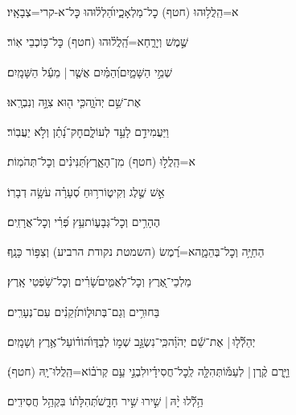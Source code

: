 \documentclass[12pt]{article}
\newcommand{\loc}[1]{\textsuperscript{\locf{#1}}}
\begin{document}
{\loc{ ב}~}‏א=הַֽלֲל֥וּהוּ (חטף) כׇל־מַלְאָכָ֑יו{\hfill}הַ֝לְל֗וּהוּ כׇּל־א-קרי=צְבָאָֽיו׃\par

{\loc{ ג}~}‏ שֶׁ֣מֶשׁ וְיָרֵ֑חַ{\hfill}א=הַֽ֝לֲל֗וּהוּ (חטף) כׇּל־כּ֥וֹכְבֵי אֽוֹר׃\par

{\loc{ ד}~}‏ שְׁמֵ֣י הַשָּׁמָ֑יִם{\hfill}וְ֝הַמַּ֗יִם אֲשֶׁ֤ר |  מֵעַ֬ל הַשָּׁמָֽיִם׃\par

{\loc{ ה}~}‏ אֶת־שֵׁ֣ם יְהֹוָ֑ה{\hfill}כִּ֤י ה֖וּא צִוָּ֣ה וְנִבְרָֽאוּ׃\par

{\loc{ ו}~}‏וַיַּעֲמִידֵ֣ם לָעַ֣ד לְעוֹלָ֑ם{\hfill}חׇק־נָ֝תַ֗ן וְלֹ֣א יַעֲבֽוֹר׃\par

{\loc{ ז}~}‏א=הַֽלֲל֣וּ (חטף)  מִן־הָאָ֑רֶץ{\hfill}תַּ֝נִּינִ֗ים וְכׇל־תְּהֹמֽוֹת׃\par

{\loc{ ח}~}‏אֵ֣שׁ  שֶׁ֣לֶג וְקִיט֑וֹר{\hfill}ר֥וּחַ סְ֝עָרָ֗ה עֹשָׂ֥ה דְבָרֽוֹ׃\par

{\loc{ ט}~}‏הֶהָרִ֥ים וְכׇל־גְּבָע֑וֹת{\hfill}עֵ֥ץ פְּ֝רִ֗י וְכׇל־אֲרָזִֽים׃\par

{\loc{ י}~}‏הַחַיָּ֥ה וְכׇל־בְּהֵמָ֑ה{\hfill}א=רֶ֝מֶשׂ (השמטת נקודת הרביע) וְצִפּ֥וֹר כָּנָֽף׃\par

{\loc{ יא}~}‏מַלְכֵי־אֶ֭רֶץ וְכׇל־לְאֻמִּ֑ים{\hfill}שָׂ֝רִ֗ים וְכׇל־שֹׁ֥פְטֵי אָֽרֶץ׃\par

{\loc{ יב}~}‏בַּחוּרִ֥ים וְגַם־בְּתוּל֑וֹת{\hfill}זְ֝קֵנִ֗ים עִם־נְעָרִֽים׃\par

{\loc{ יג}~}‏יְהַלְﬞל֤וּ |  אֶת־שֵׁ֬ם יְהֹוָ֗ה{\hfill}כִּֽי־נִשְׂגָּ֣ב שְׁמ֣וֹ לְבַדּ֑וֹ\newline\hspace*{.5em}ה֝וֹד֗וֹ{\hfill}עַל־אֶ֥רֶץ וְשָׁמָֽיִם׃\par

{\loc{ יד}~}‏וַיָּ֤רֶם קֶ֨רֶן |  לְעַמּ֡וֹ{\hfill}תְּהִלָּ֤ה לְֽכׇל־חֲסִידָ֗יו\newline\hspace*{.5em}לִבְנֵ֣י  עַ֥ם קְרֹב֗וֹ{\hfill}א=הַֽלֲלוּ־יָֽהּ (חטף)׃\par\pend
\ledpb
\pstart[\subsection*{\textcolor{red}{פרק קמט}}]\label{פרק קמט}
{\loc{ א}~}‏הַ֥לְﬞלוּ יָ֨הּ | \newline\hspace*{.5em}שִׁ֣ירוּ  שִׁ֣יר חָדָ֑שׁ{\hfill}תְּ֝הִלָּת֗וֹ בִּקְהַ֥ל חֲסִידִֽים׃\par
\end{document}
